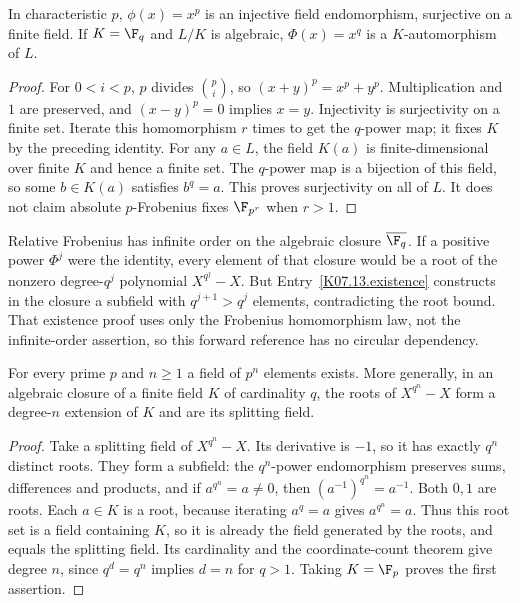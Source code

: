 \begin{theorem}
In characteristic $p$, $\phi(x)=x^p$ is an injective field endomorphism, surjective on a finite field. If $K=\F_q$ and $L/K$ is algebraic, $\Phi(x)=x^q$ is a $K$-automorphism of $L$.
\end{theorem}
\begin{proof}
For $0<i<p$, $p$ divides $\binom pi$, so $(x+y)^p=x^p+y^p$. Multiplication and $1$ are preserved, and $(x-y)^p=0$ implies $x=y$. Injectivity is surjectivity on a finite set. Iterate this homomorphism $r$ times to get the $q$-power map; it fixes $K$ by the preceding identity. For any $a\in L$, the field $K(a)$ is finite-dimensional over finite $K$ and hence a finite set. The $q$-power map is a bijection of this field, so some $b\in K(a)$ satisfies $b^q=a$. This proves surjectivity on all of $L$. It does not claim absolute $p$-Frobenius fixes $\F_{p^r}$ when $r>1$.
\end{proof}

\begin{remark}
Relative Frobenius has infinite order on the algebraic closure $\overline{\F_q}$. If a positive power $\Phi^j$ were the identity, every element of that closure would be a root of the nonzero degree-$q^j$ polynomial $X^{q^j}-X$. But Entry~\ref{K07.13.existence} constructs in the closure a subfield with $q^{j+1}>q^j$ elements, contradicting the root bound. That existence proof uses only the Frobenius homomorphism law, not the infinite-order assertion, so this forward reference has no circular dependency.
\end{remark}

\begin{theorem}
For every prime $p$ and $n\geq1$ a field of $p^n$ elements exists. More generally, in an algebraic closure of a finite field $K$ of cardinality $q$, the roots of $X^{q^n}-X$ form a degree-$n$ extension of $K$ and are its splitting field.
\end{theorem}
\begin{proof}
Take a splitting field of $X^{q^n}-X$. Its derivative is $-1$, so it has exactly $q^n$ distinct roots. They form a subfield: the $q^n$-power endomorphism preserves sums, differences and products, and if $a^{q^n}=a\ne0$, then $(a^{-1})^{q^n}=a^{-1}$. Both $0,1$ are roots. Each $a\in K$ is a root, because iterating $a^q=a$ gives $a^{q^n}=a$. Thus this root set is a field containing $K$, so it is already the field generated by the roots, and equals the splitting field. Its cardinality and the coordinate-count theorem give degree $n$, since $q^d=q^n$ implies $d=n$ for $q>1$. Taking $K=\F_p$ proves the first assertion.
\end{proof}


